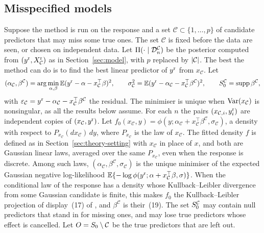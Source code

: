\subsection{Misspecified models}\label{sec:theory-mis}

Suppose the method is run on the response and a set $\mathcal C\subset\{1,\dots,p\}$ of candidate predictors that may
miss some true ones. The set $\mathcal C$ is fixed before the data are seen, or chosen on independent data. Let $\Pi(\cdot\mid\mathcal D_n^{\mathcal C})$ be the posterior computed from
$(y^{\mathrm r},X^{\mathrm r}_{\mathcal C})$ as in Section~\ref{sec:model}, with $p$ replaced by $\lvert \mathcal C\rvert$. The best the method can
do is to find the best linear predictor of $y^{\mathrm r}$ from $x_{\mathcal C}$. Let
\[
  (\alpha_{\mathcal C},\beta^{\mathcal C})=\arg\min_{\alpha,\beta}\operatorname{\mathbb{E}}(y^{\mathrm r}-\alpha-x_{\mathcal C}^\top\beta)^2,\qquad
  \sigma_{\mathcal C}^2=\operatorname{\mathbb{E}}(y^{\mathrm r}-\alpha_{\mathcal C}-x_{\mathcal C}^\top\beta^{\mathcal C})^2,\qquad
  S_0^{\mathcal C}=\operatorname{supp}\beta^{\mathcal C},
\]
with $\varepsilon_{\mathcal C}=y^{\mathrm r}-\alpha_{\mathcal C}-x_{\mathcal C}^\top\beta^{\mathcal C}$ the residual. The
minimiser is unique when $\operatorname{Var}(x_{\mathcal C})$ is nonsingular, as all the results below assume. For each $n$ the
pairs $(x_{\mathcal C,i},y^{\mathrm r}_i)$ are independent copies of $(x_{\mathcal C},y^{\mathrm r})$. Let
$f_0(x_{\mathcal C},y)=\phi(y;\alpha_{\mathcal C}+x_{\mathcal C}^\top\beta^{\mathcal C},\sigma_{\mathcal C})$, a density
with respect to $P_{x_{\mathcal C}}(dx_{\mathcal C})\,dy$, where $P_{x_{\mathcal C}}$ is the law of $x_{\mathcal C}$. The
fitted density $f$ is defined as in Section~\ref{sec:theory-setting} with $x_{\mathcal C}$ in place of $x$, and both are
Gaussian linear laws, averaged over the same $P_{x_{\mathcal C}}$, even when the response is discrete. Among such
laws, $(\alpha_{\mathcal C},\beta^{\mathcal C},\sigma_{\mathcal C})$ is the unique minimiser of the expected Gaussian
negative log-likelihood $\operatorname{\mathbb{E}}\{-\log\phi(y^{\mathrm r};\alpha+x_{\mathcal C}^\top\beta,\sigma)\}$. When the conditional law of the
response has a density whose Kullback--Leibler divergence from some Gaussian candidate is finite, this makes $f_0$ the
Kullback--Leibler projection of display~(17) of \citet{SongLiang2015}, and $\beta^{\mathcal C}$ is their~(19). The set
$S_0^{\mathcal C}$ may contain null predictors that stand in for missing ones, and may lose true predictors whose effect
is cancelled. Let $O=S_0\setminus\mathcal C$ be the true predictors that are left out.

